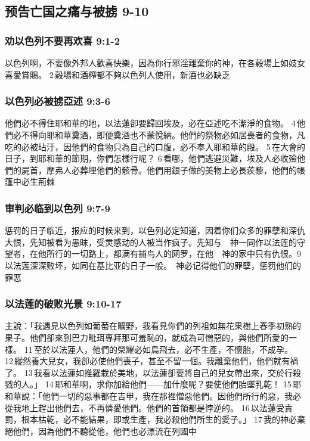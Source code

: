 \subsection{预告亡国之痛与被掳 9-10}
\subsubsection{劝以色列不要再欢喜 9:1-2}
以色列啊，不要像外邦人歡喜快樂，因為你行邪淫離棄你的神，在各穀場上如妓女喜愛賞賜。 2 穀場和酒榨都不夠以色列人使用，新酒也必缺乏

\subsubsection{以色列必被掳亞述 9:3-6}
他們必不得住耶和華的地，以法蓮卻要歸回埃及，必在亞述吃不潔淨的食物。 4 他們必不得向耶和華奠酒，即便奠酒也不蒙悅納。他們的祭物必如居喪者的食物，凡吃的必被玷汙，因他們的食物只為自己的口腹，必不奉入耶和華的殿。 5 在大會的日子，到耶和華的節期，你們怎樣行呢？ 6 看哪，他們逃避災難，埃及人必收殮他們的屍首，摩弗人必葬埋他們的骸骨。他們用銀子做的美物上必長蒺藜，他們的帳篷中必生荊棘

\subsubsection{审判必临到以色列 9:7-9}
惩罚的日子临近，报应的时候来到，以色列必定知道，因着你们众多的罪孽和深仇大恨，先知被看为愚昧，受灵感动的人被当作疯子。先知与　神一同作以法莲的守望者，在他所行的一切路上，都满有捕鸟人的网罗，在他　神的家中只有仇恨。9以法莲深深败坏，如同在基比亚的日子一般。　神必记得他们的罪孽，惩罚他们的罪恶

\subsubsection{以法莲的破败光景 9:10-17}
主說：「我遇見以色列如葡萄在曠野，我看見你們的列祖如無花果樹上春季初熟的果子。他們卻來到巴力毗珥專拜那可羞恥的，就成為可憎惡的，與他們所愛的一樣。 11 至於以法蓮人，他們的榮耀必如鳥飛去，必不生產，不懷胎，不成孕。 12 縱然養大兒女，我卻必使他們喪子，甚至不留一個。我離棄他們，他們就有禍了。 13 我看以法蓮如推羅栽於美地，以法蓮卻要將自己的兒女帶出來，交於行殺戮的人。」 14 耶和華啊，求你加給他們——加什麼呢？要使他們胎墜乳乾！ 15 耶和華說：「他們一切的惡事都在吉甲，我在那裡憎惡他們。因他們所行的惡，我必從我地上趕出他們去，不再憐愛他們。他們的首領都是悖逆的。 16 以法蓮受責罰，根本枯乾，必不能結果，即或生產，我必殺他們所生的愛子。」 17 我的神必棄絕他們，因為他們不聽從他，他們也必漂流在列國中


